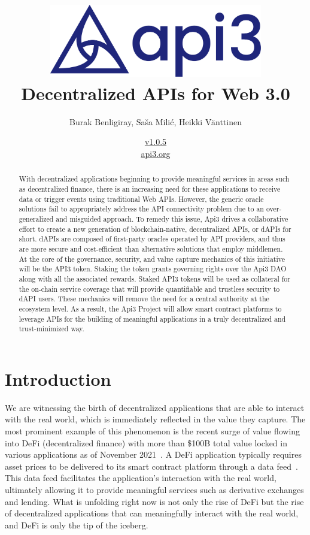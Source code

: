 \documentclass[11pt]{article}
\title{\includegraphics[width=0.7\textwidth]{fig/api3/api3} \\ Decentralized APIs for Web 3.0}
\author{Burak Benligiray, Sa\v{s}a Mili\'{c}, Heikki Vänttinen}
\date{\hyperref[sec:versions]{v1.0.5} \\ \medskip \href{https://api3.org}{api3.org}}
\begin{document}

\maketitle

\begin{abstract}
\noindent 
With decentralized applications beginning to provide meaningful services in areas such as decentralized finance, there is an increasing need for these applications to receive data or trigger events using traditional Web APIs.
However, the generic oracle solutions fail to appropriately address the API connectivity problem due to an over-generalized and misguided approach.
To remedy this issue, Api3 drives a collaborative effort to create a new generation of blockchain-native, decentralized APIs, or dAPIs for short.
dAPIs are composed of first-party oracles operated by API providers, and thus are more secure and cost-efficient than alternative solutions that employ middlemen.
At the core of the governance, security, and value capture mechanics of this initiative will be the API3 token.
Staking the token grants governing rights over the Api3 DAO along with all the associated rewards.
Staked API3 tokens will be used as collateral for the on-chain service coverage that will provide quantifiable and trustless security to dAPI users.
These mechanics will remove the need for a central authority at the ecosystem level.
As a result, the Api3 Project will allow smart contract platforms to leverage APIs for the building of meaningful applications in a truly decentralized and trust-minimized way.
\end{abstract}

\newpage
{}
\setcounter{page}{2}
\renewcommand{\contentsname}{} %
\tableofcontents


\newpage
{}
\setcounter{page}{1}

\section{Introduction}
\label{sec:introduction}

We are witnessing the birth of decentralized applications that are able to interact with the real world, which is immediately reflected in the value they capture.
The most prominent example of this phenomenon is the recent surge of value flowing into DeFi (decentralized finance) with more than \$100B total value locked in various applications as of November 2021~\cite{defipulse}.
A DeFi application typically requires asset prices to be delivered to its smart contract platform through a data feed~\cite{liu:2020}.
This data feed facilitates the application’s interaction with the real world, ultimately allowing it to provide meaningful services such as derivative exchanges and lending.
What is unfolding right now is not only the rise of DeFi but the rise of decentralized applications that can meaningfully interact with the real world, and DeFi is only the tip of the iceberg.
\end{document}
